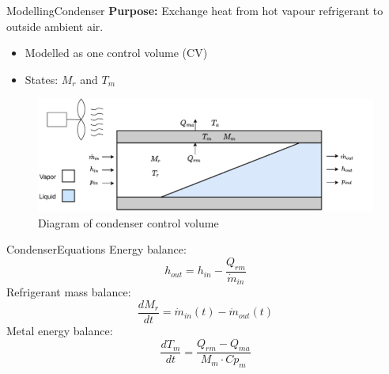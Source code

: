 \begin{frame}{Modelling}{Condenser}
	\textbf{Purpose:} Exchange heat from hot vapour refrigerant to outside ambient air.
	\begin{itemize}
		\item Modelled as one control volume (CV)
		\item States: $M_r$ and $T_m$
	\end{itemize}
	\begin{figure}[h!]
		\centering
		\includegraphics[width=1\textwidth]{../Graphics/Condenser.pdf}
		\caption{Diagram of condenser control volume}
		\label{fig:condenser_CV}
	\end{figure}
\end{frame}
\begin{frame}{Condenser}{Equations}
	Energy balance:
	\begin{equation}
		h_{out} = h_{in} - \frac{Q_{rm}}{\dot{m}_{in}} \label{eq:Condenser_Enthalpy}
	\end{equation}
	Refrigerant mass balance:
	\begin{equation}
		\frac{dM_r}{dt} 	 = \dot{m}_{in}(t) - \dot{m}_{out}(t) \label{eq:Condenser_ChangeOfMass}
	\end{equation}
	Metal energy balance:
	\begin{equation}
		\frac{dT_m}{dt} 	 = \frac{Q_{rm} - Q_{ma}}{M_m \cdot Cp_m} \label{eq:Condenser_ChangeOfTemperature}
	\end{equation}
\end{frame}





